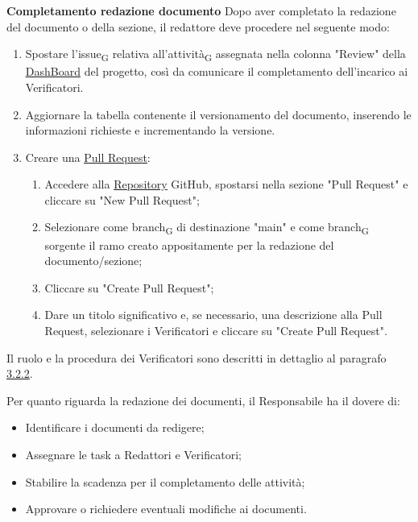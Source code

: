 \textbf{Completamento redazione documento}
Dopo aver completato la redazione del documento o della sezione, il redattore deve procedere nel seguente modo:
\begin{enumerate}
    \item Spostare l'{issue\textsubscript{G}} relativa all'{attività\textsubscript{G}} assegnata nella colonna "Review" della 
    \href{https://github.com/orgs/7Last/projects/1/views/1}{\underline{DashBoard}} del progetto, così da comunicare il completamento dell'incarico ai Verificatori.
    \item Aggiornare la tabella contenente il versionamento del documento, inserendo le informazioni richieste e incrementando la versione.
    \item Creare una \href{#pull_request}{\underline{Pull Request}}: 
    \begin{enumerate}
        \item Accedere alla \href{https://github.com/7Last/docs}{\underline{Repository}} GitHub, spostarsi nella sezione "Pull Request" e cliccare su "New Pull Request";
        \item Selezionare come {branch\textsubscript{G}} di destinazione "main" e come {branch\textsubscript{G}} sorgente il ramo creato appositamente per la redazione del documento/sezione;
        \item Cliccare su "Create Pull Request";
        \item Dare un titolo significativo e, se necessario, una descrizione alla Pull Request, selezionare i Verificatori e cliccare su "Create Pull Request".
    \end{enumerate}
\end{enumerate}

Il ruolo e la procedura dei Verificatori sono descritti in dettaglio al paragrafo \href{#verifica_dei_documenti}{\underline{3.2.2}}.

Per quanto riguarda la redazione dei documenti, il Responsabile ha il dovere di:
\begin{itemize}
    \item Identificare i documenti da redigere;
    \item Assegnare le task a Redattori e Verificatori;
    \item Stabilire la scadenza per il completamento delle attività;
    \item Approvare o richiedere eventuali modifiche ai documenti.
\end{itemize}

